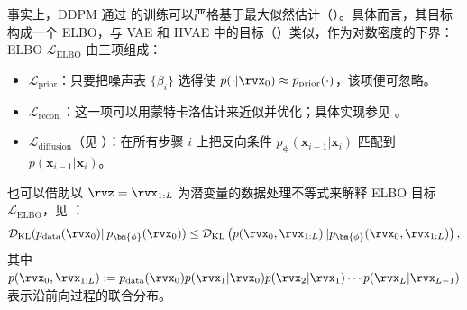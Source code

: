 事实上，DDPM 通过  的训练可以严格基于最大似然估计（）。具体而言，其目标构成一个 ELBO，与 VAE 和 HVAE 中的目标（）类似，作为对数密度的下界：
ELBO $\mathcal{L}_{\text{ELBO}}$ 由三项组成：
\begin{itemize}
    \item $\mathcal{L}_{\text{prior}}$：只要把噪声表 $\{\beta_i\}$ 选得使 $p(\cdot|\rvx_0) \approx p_{\text{prior}}(\cdot)$，该项便可忽略。
    \item $\mathcal{L}_{\text{recon.}}$：这一项可以用蒙特卡洛估计来近似并优化；具体实现参见 \citep{ho2020denoising, kingma2021variational}。
    \item $\mathcal{L}_{\text{diffusion}}$（见 ）：在所有步骤 $i$ 上把反向条件 $p_{\bm{\phi}}(\mathbf{x}_{i-1}|\mathbf{x}_i)$ 匹配到 $p(\mathbf{x}_{i-1}|\mathbf{x}_i)$。
\end{itemize}

也可以借助以 $\rvz = \rvx_{1:L}$ 为潜变量的数据处理不等式来解释 ELBO 目标 $\mathcal{L}_{\text{ELBO}}$，见 ：
\begin{align*}
    \mathcal{D}_{\mathrm{KL}}(p_{\mathrm{data}}(\rvx_0) \| p_{\bm{\phi}}(\rvx_0)) \leq \mathcal{D}_{\mathrm{KL}}\left(p(\rvx_0, \rvx_{1:L}) \| p_{\bm{\phi}}(\rvx_0, \rvx_{1:L})\right),
\end{align*}
其中 $p(\rvx_0, \rvx_{1:L}) := p_{\mathrm{data}}(\rvx_0)  p(\rvx_1|\rvx_0)  p(\rvx_2|\rvx_1) \cdots p(\rvx_L|\rvx_{L-1})$ 表示沿前向过程的联合分布。


